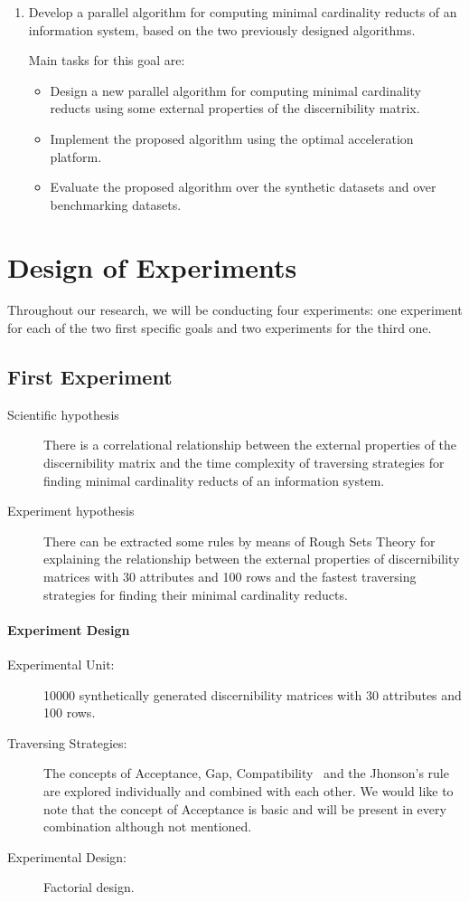 \documentclass[11pt]{article}   %
\begin{document}
\begin{enumerate}
  \item Develop a parallel algorithm for computing minimal cardinality reducts of an information system, based 
  		on the two previously designed algorithms.
  		
  		Main tasks for this goal are:
  		\begin{itemize}
  		\item Design a new parallel algorithm for computing minimal cardinality reducts using some external
  		      properties of the discernibility matrix.
  		\item Implement the proposed algorithm using the optimal acceleration platform.
  		\item Evaluate the proposed algorithm over the synthetic datasets and over benchmarking datasets.
  		\end{itemize}
  \end{enumerate}

\section{Design of Experiments}\label{DOE}
  Throughout our research, we will be conducting four experiments: one experiment for each of the two first
  specific goals and two experiments for the third one.
  
\subsection{First Experiment}\label{exprimet1}
  \begin{description}
  \item[Scientific hypothesis] There is a correlational relationship between the external properties of the discernibility 
  							   matrix and the time complexity of traversing strategies for finding minimal
  							   cardinality reducts of an information	system.
  \item[Experiment hypothesis] There can be extracted some rules by means of Rough Sets Theory for explaining
  							   the relationship between the external properties of discernibility matrices
  							   with 30 attributes and 100 rows and the fastest traversing strategies for finding
  							   their minimal cardinality reducts.  
  \end{description}
  \paragraph{Experiment Design} 
	  \begin{description}
	  	\item[Experimental Unit:] 10000 synthetically generated discernibility matrices with 30 attributes and
	  							  100 rows.
	  	\item[Traversing Strategies:] The concepts of Acceptance, Gap, Compatibility~\cite{Lias13} and the 
	  								  Jhonson's rule~\cite{Ohrn00} are explored individually and combined with 
	  								  each other. We would like to note that the concept of Acceptance is basic
	  								  and will be present in every combination although not mentioned.
	  	\item[Experimental Design:] Factorial design.
	  \end{description}
\end{document}
